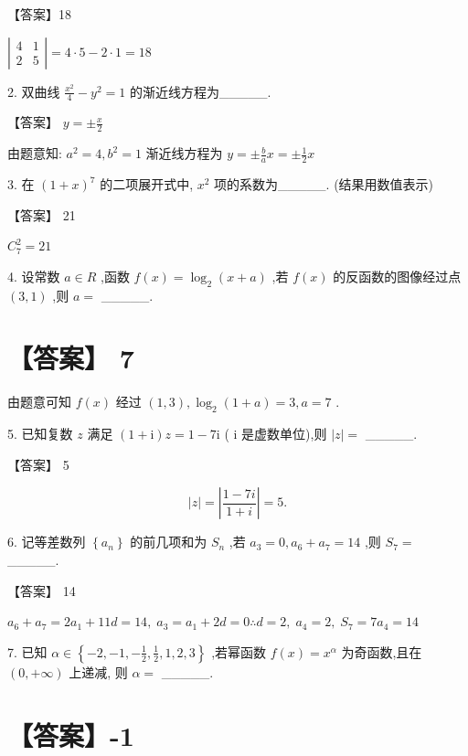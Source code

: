 \documentclass[10pt]{article}
\begin{document}
【答案】18

\(\left| \begin{array}{ll} 4 & 1 \\  2 & 5 \end{array}\right|  = 4 \cdot  5 - 2 \cdot  1 = {18}\)

2. 双曲线 \(\frac{{x}^{2}}{4} - {y}^{2} = 1\) 的渐近线方程为\_\_\_\_\_.

【答案】 \(y =  \pm  \frac{x}{2}\)

由题意知: \({a}^{2} = 4,{b}^{2} = 1\) 渐近线方程为 \(y =  \pm  \frac{b}{a}x =  \pm  \frac{1}{2}x\)

3. 在 \({\left( 1 + x\right) }^{7}\) 的二项展开式中, \({x}^{2}\) 项的系数为\_\_\_\_\_. (结果用数值表示)

【答案】 21

\({C}_{7}^{2} = {21}\)

4. 设常数 \(a \in  R\) ,函数 \(f\left( x\right)  = {\log }_{2}\left( {x + a}\right)\) ,若 \(f\left( x\right)\) 的反函数的图像经过点 \(\left( {3,1}\right)\) ,则 \(a =\) \_\_\_\_\_.

\section*{【答案】 7}

由题意可知 \(f\left( x\right)\) 经过 \(\left( {1,3}\right) ,{\log }_{2}\left( {1 + a}\right)  = 3,a = 7\) .

5. 已知复数 \(z\) 满足 \(\left( {1 + \mathrm{i}}\right) z = 1 - 7\mathrm{i}\) ( \(\mathrm{i}\) 是虚数单位),则 \(\left| z\right|  =\) \_\_\_\_\_.

【答案】 5

\[
\left| z\right|  = \left| \frac{1 - {7i}}{1 + i}\right|  = 5.
\]

6. 记等差数列 \(\left\{  {a}_{n}\right\}\) 的前几项和为 \({S}_{n}\) ,若 \({a}_{3} = 0,{a}_{6} + {a}_{7} = {14}\) ,则 \({S}_{7} =\) \_\_\_\_\_.

【答案】 14

\({a}_{6} + {a}_{7} = 2{a}_{1} + {11d} = {14},\;{a}_{3} = {a}_{1} + {2d} = 0\therefore d = 2,\;{a}_{4} = 2,\;{S}_{7} = 7{a}_{4} = {14}\)

7. 已知 \(\alpha  \in  \left\{  {-2, - 1, - \frac{1}{2},\frac{1}{2},1,2,3}\right\}\) ,若幂函数 \(f\left( x\right)  = {x}^{\alpha }\) 为奇函数,且在 \(\left( {0, + \infty }\right)\) 上递减, 则 \(\alpha  =\) \_\_\_\_\_.

\section*{【答案】-1}
\end{document}
